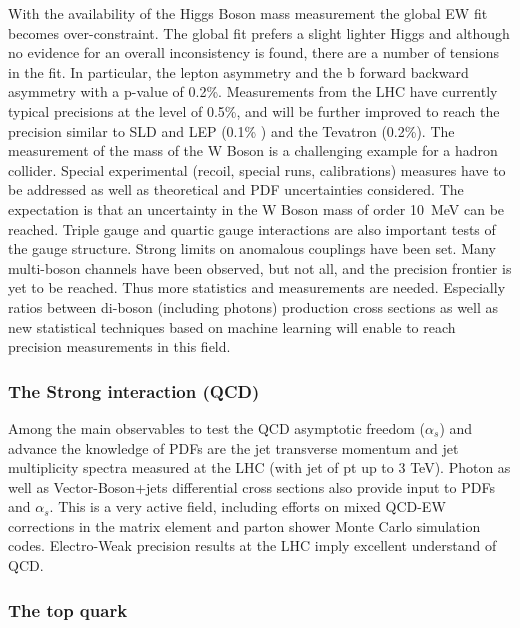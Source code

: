 \noindent With the availability of the Higgs Boson mass
measurement the global EW fit becomes over-constraint. The global fit
prefers a slight lighter Higgs and although no evidence for an overall
inconsistency is found, there are a number of tensions in the fit. In
particular, the lepton asymmetry and the b forward backward asymmetry
with a p-value of 0.2\%. Measurements from the LHC have currently
typical precisions at the level of 0.5\%, and will be further improved
to reach the precision similar to SLD and LEP (0.1\% ) and the Tevatron
(0.2\%). The measurement of the mass of the W Boson is a challenging
example for a hadron collider. Special experimental (recoil, special
runs, calibrations) measures have to be addressed as well as theoretical
and PDF uncertainties considered. The expectation is that an uncertainty
in the W Boson mass of order 10~MeV can be reached. Triple gauge and
quartic gauge interactions are also important tests of the gauge
structure. Strong limits on anomalous couplings have been set. Many
multi-boson channels have been observed, but not all, and the precision
frontier is yet to be reached. Thus more statistics and measurements are
needed. Especially ratios between di-boson (including photons)
production cross sections as well as new statistical techniques based on
machine learning will enable to reach precision measurements in this
field. 

\subsubsection*{The Strong interaction (QCD)}

\noindent Among the main observables to test
the QCD asymptotic freedom ($\alpha_s$) and advance the knowledge of PDFs
are the jet transverse momentum and jet multiplicity spectra measured at
the LHC (with jet of pt up to 3 TeV). Photon as well as
Vector-Boson+jets differential cross sections also provide input to PDFs
and $\alpha_s$. This is a very active field, including efforts on mixed
QCD-EW corrections in the matrix element and parton shower Monte Carlo
simulation codes. Electro-Weak precision results at the LHC imply
excellent understand of QCD.

\subsubsection*{The top quark}

